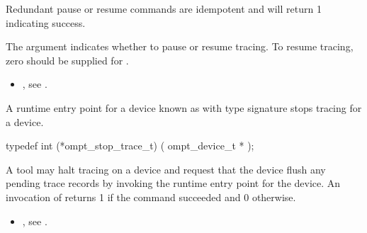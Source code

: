 Redundant pause or resume commands are idempotent and will
return 1 indicating success.

\argdesc

\devicedesc

The argument  indicates whether to pause or
resume tracing.
To resume tracing, zero should be supplied for .


\crossreferences
\begin{itemize}
\item {},
see .
\end{itemize}

\label{sec:ompt_stop_trace_t}

\summary
A runtime entry point for a device known as 
with type signature 
stops tracing for a device.

\begin{ccppspecific}
\begin{omptInquiry}
typedef int (*ompt_stop_trace_t) (
  ompt_device_t *
);
\end{omptInquiry}
\end{ccppspecific}

\descr

A tool may halt tracing on a device and request that the device flush any pending trace records
by invoking the  runtime entry point for the device.
An invocation of  returns 1 if the command
succeeded and 0 otherwise.

\argdesc

\devicedesc



\crossreferences
\begin{itemize}
\item {},
see .
\end{itemize}

